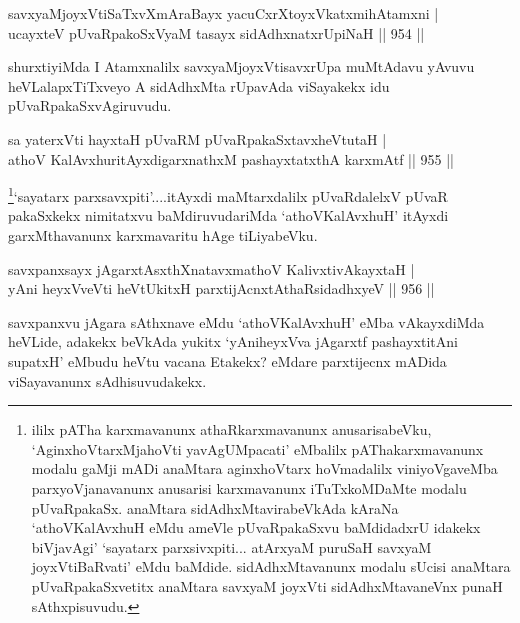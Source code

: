 \begin{shl}
savxyaMjoyxVtiSaTxvXmAraBayx yacuCxrXtoyxVkatxmihA\s \s tamxni | \\
ucayxteV pUvaRpakoSxV\s yaM tasayx sidAdhxnatxrUpiNaH \hfill||  954 ||  
\end{shl}

\begin{artha}
shurxtiyiMda I Atamxnalilx savxyaMjoyxVtisavxrUpa muMtAdavu yAvuvu heVLalapxTiTxveyo A sidAdhxMta rUpavAda viSayakekx idu pUvaRpakaSxvAgiruvudu.
\end{artha}


\begin{shl}
sa yaterxVti hayxtaH pUvaRM pUvaRpakaSxtavxheVtutaH | \\
athoV KalAvxhuritAyxdigarxnathxM pashayxtatxthA karxmAtf \hfill||  955 ||  
\end{shl}

\begin{artha}
\footnote{ililx pATha karxmavanunx athaRkarxmavanunx anusarisabeVku, `AginxhoVtarxMjahoVti yavAgUMpacati' eMbalilx pAThakarxmavanunx modalu gaMji mADi anaMtara aginxhoVtarx hoVmadalilx  viniyoVgaveMba parxyoVjanavanunx anusarisi karxmavanunx iTuTxkoMDaMte modalu pUvaRpakaSx. anaMtara sidAdhxMtavirabeVkAda kAraNa `athoVKalAvxhuH eMdu ameVle pUvaRpakaSxvu baMdidadxrU idakekx biVjavAgi'  `sayatarx parxsivxpiti... atArxyaM puruSaH savxyaM joyxVtiBaRvati' eMdu baMdide. sidAdhxMtavanunx modalu sUcisi anaMtara pUvaRpakaSxvetitx anaMtara savxyaM joyxVti sidAdhxMtavaneVnx punaH sAthxpisuvudu.}`sayatarx parxsavxpiti'....itAyxdi maMtarxdalilx pUvaRdalelxV pUvaR pakaSxkekx nimitatxvu baMdiruvudariMda `athoVKalAvxhuH' itAyxdi garxMthavanunx karxmavaritu hAge tiLiyabeVku.
\end{artha}


\begin{shl}
savxpanxsayx jAgarxtAsxthXnatavxmathoV KalivxtivAkayxtaH | \\
yAni heyxVveVti heVtUkitxH parxtijAcnxtAthaRsidadhxyeV \hfill||  956 ||  
\end{shl}

\begin{artha}
savxpanxvu jAgara sAthxnave eMdu `athoVKalAvxhuH' eMba vAkayxdiMda heVLide, adakekx beVkAda yukitx `yAniheyxVva jAgarxtf pashayxtitAni supatxH' eMbudu heVtu vacana Etakekx? eMdare parxtijecnx mADida viSayavanunx sAdhisuvudakekx.
\end{artha}

